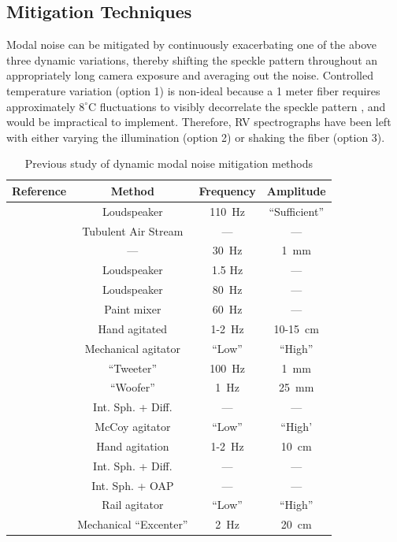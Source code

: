 \documentclass[twocolumn]{emulateapj}
\begin{document}
\subsection{Mitigation Techniques}
\label{subsec:mitigation}

Modal noise can be mitigated by continuously exacerbating one of the above three dynamic variations, thereby shifting the speckle pattern throughout an appropriately long camera exposure and averaging out the noise. Controlled temperature variation (option 1) is non-ideal because a 1 meter fiber requires approximately $8 ^\circ \mathrm{C}$ fluctuations to visibly decorrelate the speckle pattern \citep{Redding2013}, and would be impractical to implement. Therefore, RV spectrographs have been left with either varying the illumination (option 2) or shaking the fiber (option 3).

\begin{table}
\centering
\caption{Previous study of dynamic modal noise mitigation methods}
	\begin{tabular}{cccc}
		\hline
		Reference & Method & Frequency & Amplitude \\
		\hline\hline
		\citet{Daino1980} & Loudspeaker & \SI{110}{\hertz} & ``Sufficient'' \\
		\hline
		\citet{Hill1980} & Tubulent Air Stream & --- & --- \\
		\hline
		\citet{Baudrand2001} & --- & \SI{30}{\hertz} & \SI{1}{\milli\meter} \\
		\hline
		\multirow{2}{*}{\citet{Lemke2011}} & Loudspeaker & 1.5 Hz & --- \\
		 & Loudspeaker & \SI{80}{\hertz} & --- \\
		\hline
		\multirow{3}{*}{\citet{McCoy2012}} & Paint mixer & \SI{60}{\hertz} & --- \\
		 & Hand agitated & 1-\SI{2}{\hertz} & 10-\SI{15}{\centi\meter} \\
		 & Mechanical agitator & ``Low'' & ``High''\\
		\hline
		\multirow{2}{*}{\citet{Plavchan2013}} & ``Tweeter'' & \SI{100}{\hertz} & \SI{1}{\milli\meter} \\
		 & ``Woofer'' & \SI{1}{\hertz} & \SI{25}{\milli\meter} \\
		\hline
		\multirow{3}{*}{\citet{Mahadevan2014}} & Int. Sph. + Diff. & --- & ---\\
		 & McCoy agitator & ``Low'' & ``High' \\
		 & Hand agitation & 1-\SI{2}{\hertz} & \SI{10}{\centi\meter} \\
		\hline
		\multirow{2}{*}{\citet{Halverson2014}} & Int. Sph. + Diff. & --- & --- \\
		 & Int. Sph. + OAP & --- & --- \\
		\hline		
		\citet{Roy2014} & Rail agitator & ``Low'' & ``High'' \\
		\hline
		\citet{Sablowski2015} & Mechanical ``Excenter''& \SI{2}{\hertz} & \SI{20}{\centi\meter} \\
		\hline
	\end{tabular}
\label{table:previous_studies}
\end{table}
\end{document}
